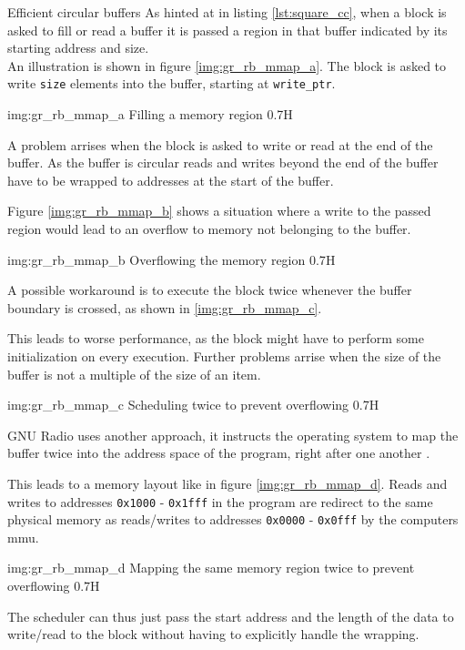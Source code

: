 \begin{subchapter}{Efficient circular buffers}
  As hinted at in listing \ref{lst:square_cc}, when a block
  is asked to fill or read a buffer it is passed a region in
  that buffer indicated by its starting address and size. \\

  An illustration is shown in figure \ref{img:gr_rb_mmap_a}.
  The block is asked to write \texttt{size} elements into
  the buffer, starting at \texttt{write\_ptr}.

               {img:gr_rb_mmap_a}
               {Filling a memory region}
               {0.7}{H}

  A problem arrises when the block is asked to write or read
  at the end of the buffer.
  As the buffer is circular reads and writes beyond the
  end of the buffer have to be wrapped to addresses at the start of the
  buffer.

  Figure \ref{img:gr_rb_mmap_b} shows a situation where
  a write to the passed region would lead to an overflow
  to memory not belonging to the buffer.

               {img:gr_rb_mmap_b}
               {Overflowing the memory region}
               {0.7}{H}

  A possible workaround is to execute the block
  twice whenever the buffer boundary is crossed,
  as shown in \ref{img:gr_rb_mmap_c}.

  This leads to worse performance, as the block might have
  to perform some initialization on every execution.
  Further problems arrise when the size of the buffer is not
  a multiple of the size of an item.

               {img:gr_rb_mmap_c}
               {Scheduling twice to prevent overflowing}
               {0.7}{H}

  GNU Radio uses another approach, it instructs the operating system
  to map the buffer twice into the address space of the program,
  right after one another \cite{grrdbufmmap}.

  This leads to a memory layout like in figure \ref{img:gr_rb_mmap_d}.
  Reads and writes to addresses \texttt{0x1000} - \texttt{0x1fff} in the program
  are redirect to the same physical memory as reads/writes to addresses
  \texttt{0x0000} - \texttt{0x0fff} by the computers \gls{mmu}.

               {img:gr_rb_mmap_d}
               {Mapping the same memory region twice to prevent overflowing}
               {0.7}{H}

  The scheduler can thus just pass the start address and the length of
  the data to write/read to the block without having to explicitly handle
  the wrapping.
\end{subchapter}
